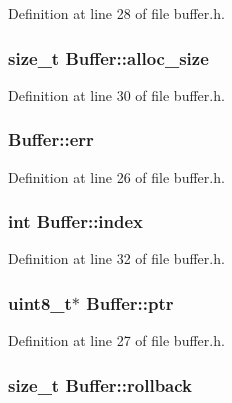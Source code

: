 Definition at line 28 of file buffer.\-h.

\hypertarget{struct_buffer_a96fe3160d9fc953e060a14b6c2ad52bd}{
\subsubsection[{alloc\-\_\-size}]{\setlength{\rightskip}{0pt plus 5cm}size\-\_\-t Buffer\-::alloc\-\_\-size}}\label{struct_buffer_a96fe3160d9fc953e060a14b6c2ad52bd}


Definition at line 30 of file buffer.\-h.

\hypertarget{struct_buffer_a879aecdae33529cd7b68da64db41e5af}{
\subsubsection[{err}]{ Buffer\-::err}}\label{struct_buffer_a879aecdae33529cd7b68da64db41e5af}


Definition at line 26 of file buffer.\-h.

\hypertarget{struct_buffer_abb6fa5333fd31327f6c5cb2e56e4a5ae}{
\subsubsection[{index}]{\setlength{\rightskip}{0pt plus 5cm}int Buffer\-::index}}\label{struct_buffer_abb6fa5333fd31327f6c5cb2e56e4a5ae}


Definition at line 32 of file buffer.\-h.

\hypertarget{struct_buffer_a31a306e12a70a812149b2eaf22279ea5}{
\subsubsection[{ptr}]{\setlength{\rightskip}{0pt plus 5cm}uint8\-\_\-t$\ast$ Buffer\-::ptr}}\label{struct_buffer_a31a306e12a70a812149b2eaf22279ea5}


Definition at line 27 of file buffer.\-h.

\hypertarget{struct_buffer_a056d3a336c67135e9c516bc6bd20e6b7}{
\subsubsection[{rollback}]{\setlength{\rightskip}{0pt plus 5cm}size\-\_\-t Buffer\-::rollback}}\label{struct_buffer_a056d3a336c67135e9c516bc6bd20e6b7}


